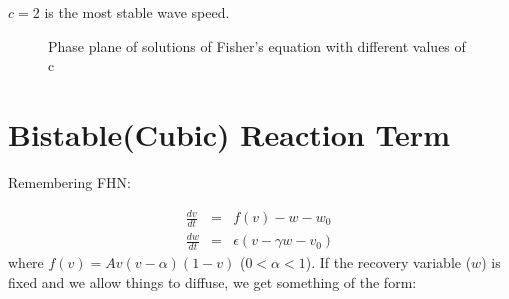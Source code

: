 \documentclass[]{article}
\numberwithin{equation}{section}		%
\def\bea{\begin{eqnarray}}
\def\ena{\end{eqnarray}}
\def\dt#1{\frac{d#1}{dt}{}}
\begin{document}
$c=2$ is the most stable wave speed.

\begin{figure}[tbh]
\begin{centering}
\par\end{centering}
\caption{\label{figure:PF}Phase plane of solutions of Fisher's equation with different values of c}
\end{figure}


\section{Bistable(Cubic) Reaction Term}
Remembering FHN:

\bea
 \dt{v} &=& f(v)-w-w_0 \nonumber \\
\dt{w} &=& \epsilon(v-\gamma w-v_0)\nonumber
\ena
\noindent where $f(v) = Av(v-\alpha)(1-v)$ ($0<\alpha<1$). If the recovery variable ($w$) is fixed and we allow things to diffuse, we get something of the form:
\end{document}
